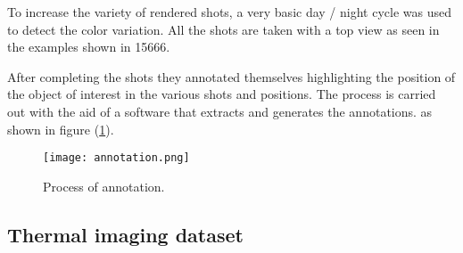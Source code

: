 To increase the variety of rendered shots, a very basic day / night cycle was used to detect the color variation.
All the shots are taken with a top view as seen in the examples shown in 15666.





After completing the shots they annotated themselves highlighting the position
of the object of interest in the various shots and positions.
The process is carried out with the aid of a software that extracts and
generates the annotations. as shown in figure (\ref{fig:annotation}).
\begin{figure}[!h]
	\centering
	\texttt{[image: annotation.png]}
	\caption{Process of annotation.}
	\label{fig:annotation}
\end{figure}







\subsection{Thermal imaging dataset}
\label{ssec:thermal-image-dataset}